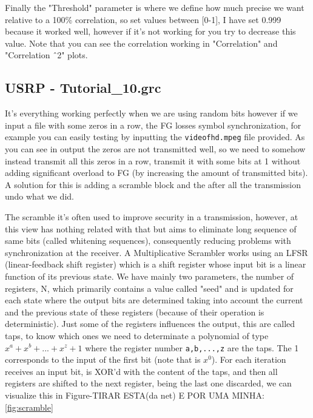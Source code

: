 \documentclass[a4paper, 10pt, conference]{ieeeconf}      %
\begin{document}
    Finally the "Threshold" parameter is where we define how much precise we want relative to a 100\% correlation, so set values between [0-1], I have set 0.999 because it worked well, however if it's not working for you try to decrease this value. Note that you can see the correlation working in "Correlation" and "Correlation  \^\ 2" plots.
 
\subsection{USRP - Tutorial\_10.grc}
    It's everything working perfectly when we are using random bits however if we input a file with some zeros in a row, the FG losses symbol synchronization, for example you can easily testing by inputting the \verb|videofhd.mpeg| file provided. As you can see in output the zeros are not transmitted well, so we need to somehow instead transmit all this zeros in a row, transmit it with some bits at 1 without adding significant overload to FG (by increasing the amount of transmitted bits). A solution for this is adding a scramble block and the after all the transmission undo what we did.
    
    
    The scramble it's often used to improve security in a transmission, however, at this view has nothing related with that but aims to eliminate long sequence of same bits (called whitening sequences), consequently reducing problems with synchronization at the receiver. A Multiplicative Scrambler works using an LFSR (linear-feedback shift register) which is a shift register whose input bit is a linear function of its previous state. We have mainly two parameters, the number of registers, N, which primarily contains a value called "seed" and is updated for each state where the output bits are determined taking into account the current and the previous state of these registers (because of their operation is deterministic). Just some of the registers influences the output, this are called taps, to know which ones we need to determinate a polynomial of type \(x^a + x^b + ... + x^z + 1\) where the register number \verb|a,b,...,z| are the taps. The 1 corresponds to the input of the first bit (note that is \(x^0\)). For each iteration receives an input bit, is XOR'd with the content of the taps, and then all registers are shifted to the next register, being the last one discarded, we can visualize this in Figure-TIRAR ESTA(da net) E POR UMA MINHA: \ref{fig:scramble}
    
\end{document}
